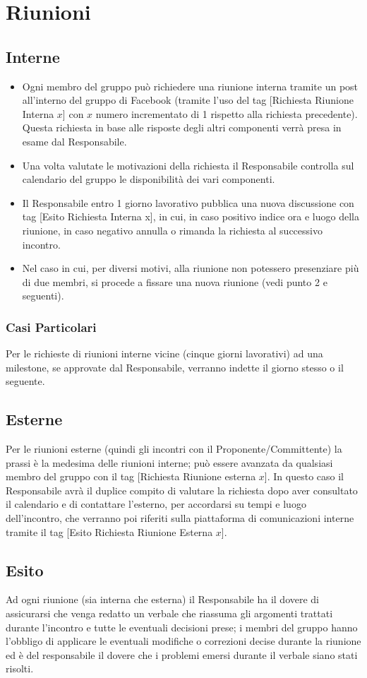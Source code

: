 \section{Riunioni}{
	\subsection{Interne}{
		\begin{itemize}
			\item Ogni membro del gruppo può richiedere una riunione interna tramite un post all’interno del gruppo di Facebook (tramite l’uso del tag [Richiesta Riunione Interna $x$] con $x$ numero incrementato di 1 rispetto alla richiesta precedente). Questa richiesta  in base alle risposte degli altri componenti verrà presa in esame dal Responsabile.
			\item Una volta valutate le motivazioni della richiesta il Responsabile controlla sul calendario del gruppo le disponibilità dei vari componenti.
			\item Il Responsabile entro 1 giorno lavorativo pubblica una nuova discussione con tag [Esito Richiesta Interna x], in cui, in caso positivo indice ora e luogo della riunione, in caso negativo annulla o rimanda la richiesta al successivo incontro.
			\item Nel caso in cui, per diversi motivi, alla riunione non potessero presenziare più di due membri, si procede a fissare una nuova riunione (vedi punto 2 e seguenti).
		\end{itemize}
		\subsubsection{Casi Particolari}{
			Per le richieste di riunioni interne vicine (cinque giorni lavorativi) ad una milestone, se approvate dal Responsabile, verranno indette il giorno stesso o il seguente.
		}
	}
	\subsection{Esterne}{
		Per le riunioni esterne (quindi gli incontri con il Proponente/Committente) la prassi è la medesima delle riunioni interne; può essere avanzata da qualsiasi membro del gruppo con il tag [Richiesta Riunione esterna $x$].
		In questo caso il Responsabile avrà il duplice compito di valutare la richiesta dopo aver consultato il calendario e di contattare  l’esterno, per accordarsi su tempi e luogo dell’incontro, che verranno poi riferiti sulla piattaforma di comunicazioni interne tramite il tag [Esito Richiesta Riunione Esterna $x$].
		}
	\subsection{Esito}{
		Ad ogni riunione (sia interna che esterna) il Responsabile ha il dovere di assicurarsi che venga redatto un verbale che riassuma gli argomenti trattati durante l’incontro e tutte le eventuali decisioni prese; i membri del gruppo hanno l’obbligo di applicare le eventuali modifiche o correzioni decise durante la riunione ed è del responsabile il dovere che i problemi emersi durante il verbale siano stati risolti.
		}
}